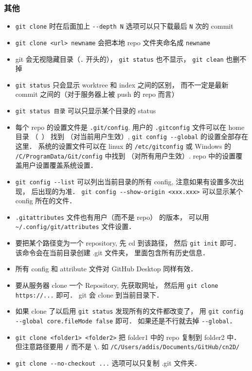 \subsubsection{其他}
\begin{itemize}
\item \verb|git clone| 时在后面加上 \verb|--depth N| 选项可以只下载最后 \verb|N| 次的 commit
\item \verb|git clone <url> newname| 会把本地 repo 文件夹命名成 \verb|newname|
\item git 会无视隐藏目录（\verb|.| 开头的）， \verb|git status| 也不显示， \verb|git clean| 也删不掉
\item \verb|git status| 只会显示 worktree 和 index 之间的区别， 而不一定是最新 commit 之间的（对于服务器上被 push 的 repo 而言）
\item \verb|git status 目录| 可以只显示某个目录的 status
\item 每个 repo 的设置文件是 \verb|.git/config|. 用户的 \verb|.gitconfig| 文件可以在 home 目录 （~） 找到 （对当前用户生效）, \verb|git config --global| 的设置全部存在这里． 系统的设置文件可以在 linux 的 \verb|/etc/gitconfig| 或 Windows 的 \verb|/C/ProgramData/Git/config| 中找到 （对所有用户生效）. repo 中的设置覆盖用户设置覆盖系统设置．
\item \verb|git config --list| 可以列出当前目录的所有 config, 注意如果有设置多次出现， 后出现的为准． \verb|git config --show-origin <xxx.xxx>| 可以显示某个 config 所在的文件．
\item \verb|.gitattributes| 文件也有用户（而不是 repo） 的版本， 可以用 \verb|~/.config/git/attributes| 文件设置．
\item 要把某个路径变为一个 repository, 先 cd 到该路径， 然后 \verb|git init| 即可． 该命令会在当前目录创建 .git 文件夹， 里面包含所有历史信息．
\item 所有 config 和 attribute 文件对 GitHub Desktop 同样有效．
\item 要从服务器 clone 一个 Repository, 先获取网址， 然后用 \verb|git clone https://...| 即可． git 会 clone 到当前目录下．
\item 如果 clone 了以后用 \verb|git status| 发现所有的文件都改变了， 用 \verb|git config --global core.fileMode false| 即可． 如果还是不行就去掉 \verb|--global|．
\item \verb|git clone <folder1> <folder2>| 把 folder1 中的 repo 复制到 folder2 中． 但注意路径要用 \verb|/| 而不是 \verb|\|. 如 \verb|/C/Users/addis/Documents/GitHub/cn2D/|
\item \verb|git clone --no-checkout ...| 选项可以只复制 .git 文件夹．

\end{itemize}
